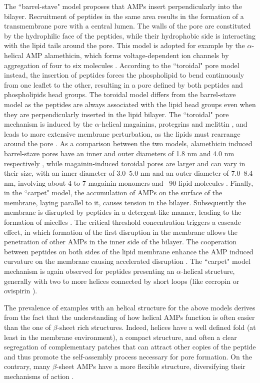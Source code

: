 The ``barrel-stave" model proposes that AMPs insert perpendicularly into the bilayer. Recruitment of peptides in the same area results in the formation of a transmembrane pore with a central lumen. The walls of the pore are constituted by the hydrophilic face of the peptides, while their hydrophobic side is interacting with the lipid tails around the pore. This model is adopted for example by the $\alpha$-helical AMP alamethicin, which forms voltage-dependent ion channels by aggregation of four to six molecules \cite{Bertelsen2012,Yang2001,Lee2004,Spaar2004}. According to the ``toroidal" pore model instead, the insertion of peptides forces the phospholipid to bend continuously from one leaflet to the other, resulting in a pore defined by both peptides and phospholipids head groups. The toroidal model differs from the barrel-stave model as the peptides are always associated with the lipid head groups even when they are perpendicularly inserted in the lipid  bilayer.
%
The ``toroidal" pore mechanism is induced by the $\alpha$-helical magainins, protegrins and melittin \cite{Yang2001,Matsuzaki1996,Hallock2003}, and leads to more extensive membrane perturbation, as the lipids must rearrange around the pore \cite{Bertelsen2012}.
%
As a comparison between the two models, alamethicin induced barrel-stave pores have an inner and outer diameters of 1.8 nm and 4.0 nm respectively \cite{Spaar2004,He1995}, while magainin-induced toroidal pores are larger and can vary in their size, with an inner diameter of 3.0–5.0 nm and an outer diameter of 7.0–8.4 nm, involving about 4 to 7 magainin monomers and ~90 lipid molecules \cite{Matsuzaki1998,Matsuzaki1997}.
%
Finally, in the ``carpet" model, the accumulation of AMPs on the surface of the membrane, laying parallel to it, causes tension in the bilayer. Subsequently the membrane is disrupted by peptides in a detergent-like manner, leading to the formation of micelles \cite{Shai1999,Ladokhin2001}.
%
The critical threshold concentration triggers a cascade effect, in which formation of the first disruption in the membrane allows the penetration of other AMPs in the inner side of the bilayer. The cooperation between peptides on both sides of the lipid membrane enhance the AMP induced curvature on the membrane causing accelerated disruption \cite{Oren1998}.
%
The ``carpet" model mechanism is again observed for peptides presenting an $\alpha$-helical structure, generally with two to more helices connected by short loops (like cecropin \cite{Gazit1995} or ovispirin \cite{Yamaguchi2001}).

The prevalence of examples with an helical structure for the above models derives from the fact that the understanding of how helical AMPs function is often easier than the one of $\beta$-sheet rich structures.
%
Indeed, helices have a well defined fold (at least in the membrane environment), a compact structure, and often a clear segregation of complementary patches that can attract other copies of the peptide and thus promote the self-assembly process necessary for pore formation. On the contrary, many $\beta$-sheet AMPs have a more flexible structure, diversifying their mechanisms of action \cite{??}.

